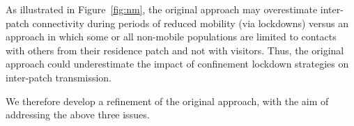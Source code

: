 \begin{enumerate}
  As illustrated in Figure~\ref{fig:nm}, the original approach may
  overestimate inter-patch connectivity during periods of reduced mobility (via lockdowns)
  versus an approach in which some or all non-mobile populations are limited to
  contacts with others from their residence patch and not with visitors.
  Thus, the original approach \cite{Arenas2020} could underestimate
  the impact of confinement lockdown strategies on inter-patch transmission.
\end{enumerate}
We therefore develop a refinement of the original approach,
with the aim of addressing the above three issues.
